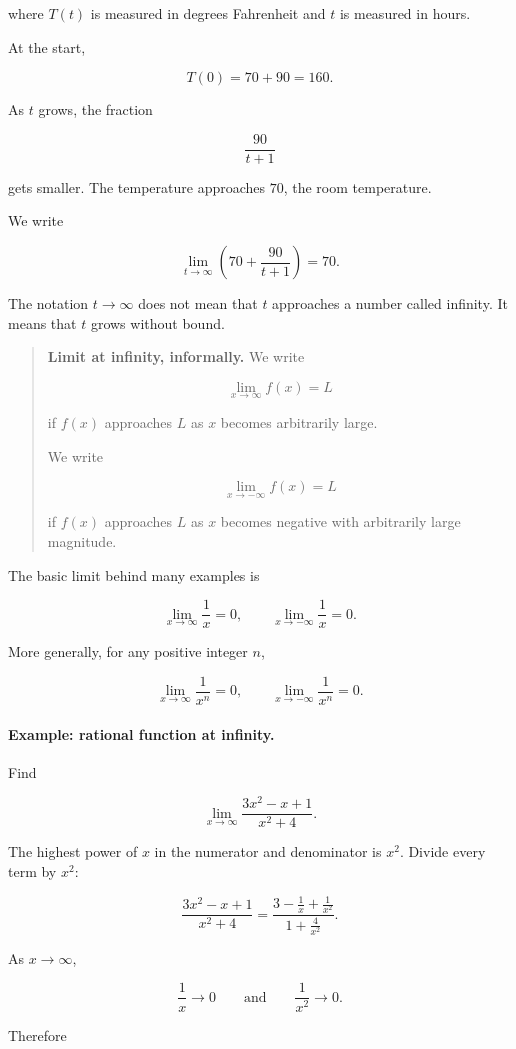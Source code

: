 where \(T(t)\) is measured in degrees Fahrenheit and \(t\) is measured in hours.

At the start,

\[
T(0)=70+90=160.
\]

As \(t\) grows, the fraction

\[
\frac{90}{t+1}
\]

gets smaller.  The temperature approaches \(70\), the room temperature.

We write

\[
\lim_{t\to\infty}\left(70+\frac{90}{t+1}\right)=70.
\]

The notation \(t\to\infty\) does not mean that \(t\) approaches a number called infinity.  It means that \(t\) grows without bound.

\begin{quote}
\textbf{Limit at infinity, informally.}
We write

\[
\lim_{x\to\infty}f(x)=L
\]

if \(f(x)\) approaches \(L\) as \(x\) becomes arbitrarily large.

We write

\[
\lim_{x\to-\infty}f(x)=L
\]

if \(f(x)\) approaches \(L\) as \(x\) becomes negative with arbitrarily large magnitude.
\end{quote}

The basic limit behind many examples is

\[
\lim_{x\to\infty}\frac1x=0,
\qquad
\lim_{x\to-\infty}\frac1x=0.
\]

More generally, for any positive integer \(n\),

\[
\lim_{x\to\infty}\frac1{x^n}=0,
\qquad
\lim_{x\to-\infty}\frac1{x^n}=0.
\]

\paragraph{Example: rational function at infinity.}
Find

\[
\lim_{x\to\infty}\frac{3x^2-x+1}{x^2+4}.
\]

The highest power of \(x\) in the numerator and denominator is \(x^2\).  Divide every term by \(x^2\):

\[
\frac{3x^2-x+1}{x^2+4}
=
\frac{3-\frac1x+\frac1{x^2}}{1+\frac4{x^2}}.
\]

As \(x\to\infty\),

\[
\frac1x\to0
\qquad\text{and}\qquad
\frac1{x^2}\to0.
\]

Therefore

